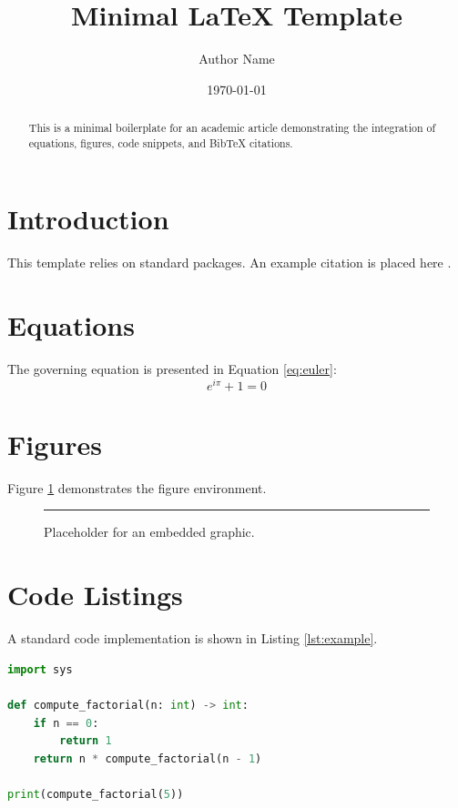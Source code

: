 \documentclass[a4paper]{article}
\title{Minimal LaTeX Template}
\author{Author Name}
\date{\today}
\begin{document}
\maketitle

\begin{abstract}
This is a minimal boilerplate for an academic article demonstrating the integration of equations, figures, code snippets, and BibTeX citations.
\end{abstract}

\section{Introduction}
This template relies on standard packages. An example citation is placed here \cite{lamport1994}.

\section{Equations}
The governing equation is presented in Equation \ref{eq:euler}:
\begin{equation} \label{eq:euler}
    e^{i\pi} + 1 = 0
\end{equation}

\section{Figures}
Figure \ref{fig:placeholder} demonstrates the figure environment.
\begin{figure}[htbp]
    \centering
    \rule{5cm}{3cm} %
    \caption{Placeholder for an embedded graphic.}
    \label{fig:placeholder}
\end{figure}

\section{Code Listings}
A standard code implementation is shown in Listing \ref{lst:example}.

\begin{lstlisting}[language=Python, caption={Python example}, label={lst:example}]
import sys

def compute_factorial(n: int) -> int:
    if n == 0:
        return 1
    return n * compute_factorial(n - 1)

print(compute_factorial(5))
\end{lstlisting}



\end{document}
